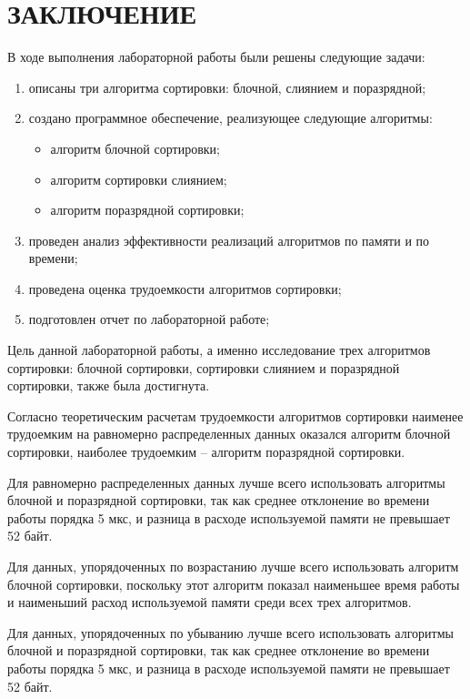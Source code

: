 \chapter*{ЗАКЛЮЧЕНИЕ}

В ходе выполнения лабораторной работы были решены следующие задачи:

\begin{enumerate}[label={\arabic*)}]
	\item описаны три алгоритма сортировки: блочной, слиянием и поразрядной;
	\item создано программное обеспечение, реализующее следующие алгоритмы:
	\begin{itemize}[label=--]
		\item алгоритм блочной сортировки;
		\item алгоритм сортировки слиянием;
		\item алгоритм поразрядной сортировки;
	\end{itemize}
	
	\item проведен анализ эффективности реализаций алгоритмов по памяти и по времени;
	\item проведена оценка трудоемкости алгоритмов сортировки;
	\item подготовлен отчет по лабораторной работе;
\end{enumerate}

Цель данной лабораторной работы, а именно исследование трех алгоритмов сортировки: блочной сортировки, сортировки слиянием и поразрядной сортировки, также была достигнута.

Согласно теоретическим расчетам трудоемкости алгоритмов сортировки наименее трудоемким на равномерно распределенных данных оказался алгоритм блочной сортировки, наиболее трудоемким -- алгоритм поразрядной сортировки.

Для равномерно распределенных данных лучше всего использовать алгоритмы блочной и поразрядной сортировки, так как среднее отклонение во времени работы порядка 5 мкс, и разница в расходе используемой памяти не превышает 52 байт.

Для данных, упорядоченных по возрастанию лучше всего использовать алгоритм блочной сортировки, поскольку этот алгоритм показал наименьшее время работы и наименьший расход используемой памяти среди всех трех алгоритмов.

Для данных, упорядоченных по убыванию лучше всего использовать алгоритмы блочной и поразрядной сортировки, так как среднее отклонение во времени работы порядка 5 мкс, и разница в расходе используемой памяти не превышает 52 байт.

